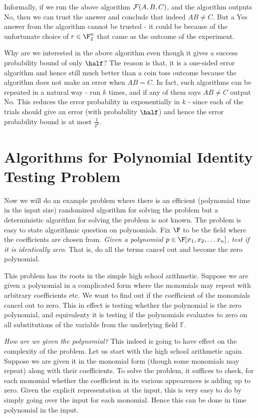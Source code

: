 \begin{remark}
Informally, if we run the above algorithm ${\cal{F}}(A,B,C)$, and the algorithm outputs {\sc No}, then we can trust the answer and conclude that indeed $AB \ne C$. But a {\sc Yes} answer from the algorithm cannot be trusted - it could be because of the unfortunate choice of $r \in \F_2^n$ that came as the outcome of the experiment.

Why are we interested in the above algorithm even though it gives a success probability bound of only $\half$? The reason is that, it is a one-sided error algorithm and hence still much better than a coin toss outcome because the algorithm does not make an error when $AB = C$. In fact, such algorithms can be repeated in a natural way - run $k$ times, and if any of them says $AB \ne C$ output {\sc No}. This reduces the error probability in exponentially in $k$ - since each of the trials should give an error (with probability $\half$) and hence the error probability bound is at most $\frac{1}{2^k}$.
\end{remark}

\section{Algorithms for Polynomial Identity Testing Problem}

Now we will do an example problem where there is an efficient (polynomial time in the input size) randomized algorithm for solving the problem but a deterministic algorithm for solving the problem is not known. The problem is easy to state algorithmic question on polynomials. Fix $\F$ to be the field where the coefficients are chosen from.
{\em Given a polynomial $p \in \F[x_1, x_2, \ldots x_n]$, test if it is identically zero}. That is, do all the terms cancel out and become the zero polynomial. 

This problem has its roots in the simple high school
arithmetic. Suppose we are given a polynomial in a complicated form where the monomials may repeat with arbitrary coefficients etc. We want to find out if the coefficient of the monomials cancel out to zero. This in effect is testing whether the polynomial is the zero
polynomial, and equivalenty it is testing if the polynomials evaluates to zero on all substitutions of the variable from the underlying field $\mathbb{F}$.

\textit{How are we given the polynomial?} This indeed is going to have effect
on the complexity of the problem.  Let us start with the high school
arithmetic again. Suppose we are given it in the monomial form (though
some monomials may repeat) along with their coefficients. To solve the
problem, it suffices to check, for each monomial whether the
coefficient in its various appearences is adding up to zero. Given the
explicit representation at the input, this is very easy to do by
simply going over the input for each monomial. Hence this can be done
in time polynomial in the input.

